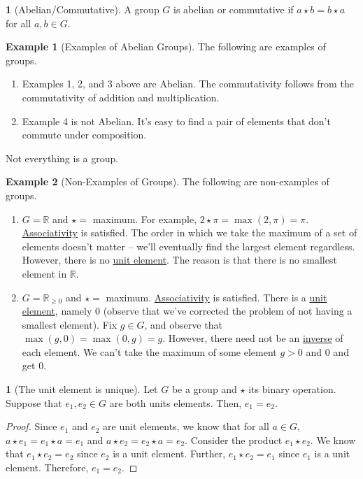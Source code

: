 \documentclass[12pt]{article}
\theoremstyle{definition}
\newtheorem{definition}{\color{NavyBlue}{\textbf{Definition}}}
\newtheorem{theorem}{\color{ForestGreen}{\textbf{Theorem}}}
\newtheorem{example}{\color{WildStrawberry}Example}
\theoremstyle{definition}
\begin{document}
\begin{definition}[Abelian/Commutative]
A group $G$ is abelian or commutative if $a \star b = b \star a$ for all $a,b \in G$.
\end{definition}

\begin{example}[Examples of Abelian Groups] The following are examples of groups.
\begin{enumerate} 
\item Examples 1, 2, and 3 above are Abelian. The commutativity follows from the commutativity of addition and multiplication.
\item Example 4 is not Abelian. It's easy to find a pair of elements that don't commute under composition.
\end{enumerate}
\end{example}

Not everything is a group.
\begin{example}[Non-Examples of Groups] The following are non-examples of groups.
\begin{enumerate}
\item $G = \mathbb{R}$ and $\star =$ maximum. For example, $2 \star \pi = \max(2,\pi) = \pi$. \underline{Associativity} is satisfied. The order in which we take the maximum of a set of elements doesn't matter -- we'll eventually find the largest element regardless. However, there is no \underline{unit element}. The reason is that there is no smallest element in $\mathbb{R}$.  
\item $G = \mathbb{R}_{\geq 0}$ and $\star =$ maximum. \underline{Associativity} is satisfied. There is a \underline{unit element}, namely $0$ (observe that we've corrected the problem of not having a smallest element). Fix $g \in G$, and observe that $\max(g,0) = \max(0,g) = g$. However, there need not be an \underline{inverse} of each element. We can't take the maximum of some element $g > 0$ and $0$ and get $0$.
\end{enumerate}
\end{example}

\begin{theorem}[The unit element is unique]
Let $G$ be a group and $\star$ its binary operation. Suppose that $e_1, e_2 \in G$ are both units elements. Then, $e_1 = e_2$.
\end{theorem}
\begin{proof}
Since $e_1$ and $e_2$ are unit elements, we know that for all $a \in G$, $a \star e_1 = e_1 \star a = e_1$ and $a \star e_2 = e_2 \star a = e_2$. Consider the product $e_1 \star e_2$. We know that $e_1 \star e_2 = e_2$ since $e_2$ is a unit element. Further, $e_1 \star e_2 = e_1$ since $e_1$ is a unit element. Therefore, $e_1 = e_2$. 
\end{proof}
\end{document}
